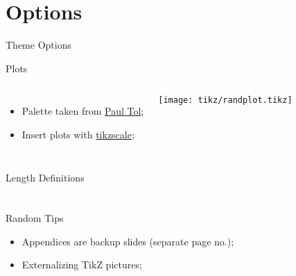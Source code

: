 \documentclass[t]{beamer}
\newcommand{\inptikz}[1]{%
  \tikzsetnextfilename{#1}%
}
\begin{document}
\section{Options}
\begin{frame}{Theme Options}
\end{frame}

\begin{frame}[fragile]{Plots}
  \begin{columns}[T]
    \begin{itemize}
      \item Palette taken from \href{https://personal.sron.nl/~pault/#sec:qualitative}{Paul Tol};
      \item Insert plots with \href{https://ctan.org/pkg/tikzscale?lang=en}{tikzscale};
    \end{itemize}
    \texttt{[image: tikz/randplot.tikz]}
  \end{columns}
\end{frame}

\begin{frame}{Length Definitions}
\end{frame}

\appendix
\section*{}

\begin{frame}[fragile]{Random Tips}
\begin{itemize}
  \item Appendices are backup slides (separate page no.);
  \item Externalizing TikZ pictures;%
  \begin{dotlst}[%
    listing side comment,righthand ratio=0.38,comment={\inptikz{onsager}}
    ]
\usepackage{tikz}
\usepackage[most]{tcolorbox}
\usetikzlibrary{external}
\tikzexternalize[prefix=build/]
\newcommand{\inptikz}[1]{%
  \tikzsetnextfilename{#1}%
}
  \end{dotlst}
\end{itemize}
\end{frame}
\end{document}
